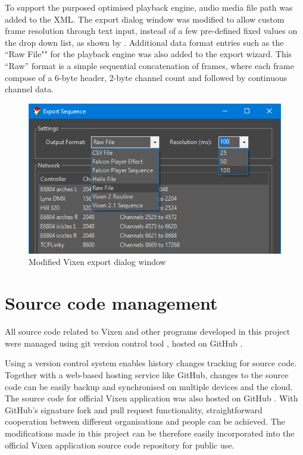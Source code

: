 To support the purposed optimised playback engine, audio media file path was added to the XML. The export dialog window was modified to allow custom frame resolution through text input, instead of a few pre-defined fixed values on the drop down list, as shown by . Additional data format entries such as the ``Raw File"" for the playback engine was also added to the export wizard. This ``Raw'' format is a simple sequential concatenation of frames, where each frame compose of a 6-byte header, 2-byte channel count and followed by continuous channel data.

\begin{figure}[t]
  \centering
  \includegraphics[width=0.75\columnwidth]{Figs/vixen_export.png}
  \caption{\footnotesize Modified Vixen export dialog window}
  \label{fig:vixen_export}
\end{figure}

\section{Source code management}

All source code related to Vixen and other programs developed in this project were managed using git version control tool \cite{git}, hosted on GitHub \cite{github} \cite{github_vixen_yz} \cite{github_project}.

Using a version control system enables history changes tracking for source code. Together with a web-based hosting service like GitHub, changes to the source code can be easily backup and synchronised on multiple devices and the cloud. The source code for official Vixen application was also hosted on GitHub \cite{github_vixen}. With GitHub's signature fork and pull request functionality, straightforward cooperation between different organisations and people can be achieved. The modifications made in this project can be therefore easily incorporated into the official Vixen application source code repository for public use.

